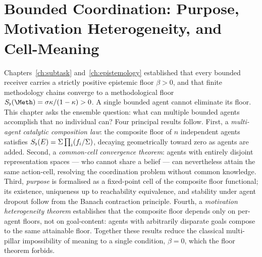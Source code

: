 \newcommand{\agent}{\mathcal{A}}           %
\newcommand{\Reach}{\operatorname{Reach}}  %
\newcommand{\Purp}{\operatorname{Purp}}    %
\newcommand{\ActionMap}{f}                 %
\newcommand{\ActionSp}{\mathcal{Y}}        %
\newcommand{\Goal}{\mathcal{G}}            %
\newcommand{\boxtimesop}{\boxtimes}        %

\chapter{Bounded Coordination: Purpose, Motivation Heterogeneity,
         and Cell-Meaning}
\label{ch:purpose}


\begin{chapterabstract}
Chapters~\ref{ch:subtask} and~\ref{ch:epistemology} established that every
bounded receiver carries a strictly positive epistemic floor $\beta>0$, and
that finite methodology chains converge to a methodological floor
$\Sfloor(\Meth)=\sigma\kappa/(1-\kappa)>0$. A single bounded agent cannot
eliminate its floor. This chapter asks the ensemble question: what can
multiple bounded agents accomplish that no individual can? Four principal
results follow. First, a \emph{multi-agent catalytic composition law}: the
composite floor of $n$ independent agents satisfies
$S_{\flat}(E)=\Sigma\prod_{i}(f_i/\Sigma)$, decaying geometrically toward zero
as agents are added. Second, a \emph{common-cell convergence theorem}: agents
with entirely disjoint representation spaces --- who cannot share a belief
--- can nevertheless attain the same action-cell, resolving the
coordination problem without common knowledge. Third, \emph{purpose} is
formalised as a fixed-point cell of the composite floor functional; its
existence, uniqueness up to reachability equivalence, and stability under
agent dropout follow from the Banach contraction principle. Fourth, a
\emph{motivation heterogeneity theorem} establishes that the composite floor
depends only on per-agent floors, not on goal-content: agents with
arbitrarily disparate goals compose to the same attainable floor. Together
these results reduce the classical multi-pillar impossibility of meaning to a
single condition, $\beta=0$, which the floor theorem forbids.
\end{chapterabstract}


